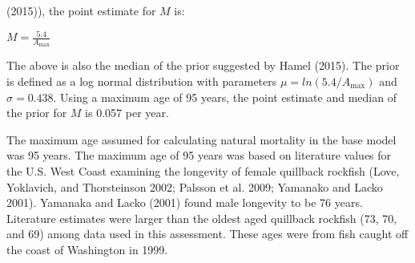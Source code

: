 \documentclass[11pt,
  english,
  a4paper,
]{article}
\begin{document}
{(2015)\leavevmode\tagmcend\tagstructend}), the point estimate for {\(M\)\leavevmode\tagmcend\tagstructend} is:

\leavevmode\tagmcend\tagstructend\par

\begin{centering}

$M=\frac{5.4}{A_{\text{max}}}$

\end{centering}


The above is also the median of the prior suggested by Hamel {(2015)\leavevmode\tagmcend\tagstructend}. The prior is defined as a log normal distribution with parameters {\(\mu = ln(5.4/A_{\text{max}})\)\leavevmode\tagmcend\tagstructend} and {\(\sigma = 0.438\)\leavevmode\tagmcend\tagstructend}. Using a maximum age of 95 years, the point estimate and median of the prior for {\(M\)\leavevmode\tagmcend\tagstructend} is 0.057 per year.

\leavevmode\tagmcend\tagstructend\par


The maximum age assumed for calculating natural mortality in the base model was 95 years. The maximum age of 95 years was based on literature values for the U.S. West Coast examining the longevity of female quillback rockfish {(Love, Yoklavich, and Thorsteinson 2002; Palsson et al. 2009; Yamanako and Lacko 2001)\leavevmode\tagmcend\tagstructend}. Yamanaka and Lacko {(2001)\leavevmode\tagmcend\tagstructend} found male longevity to be 76 years. Literature estimates were larger than the oldest aged quillback rockfish (73, 70, and 69) among data used in this assessment. These ages were from fish caught off the coast of Washington in 1999.

\leavevmode\tagmcend\tagstructend\par

\end{document}
